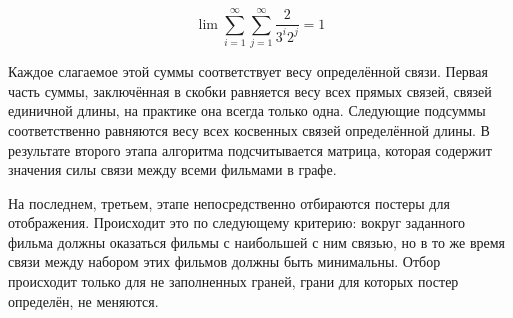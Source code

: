 \documentclass[oneside,final,12pt]{extreport}
\begin{document}
\[
\lim \sum_{i=1}^{\infty} \sum_{j=1}^{\infty} \frac{2}{ 3^{i} 2^{j} } = 1
\]

Каждое слагаемое этой суммы соответствует весу определённой связи. Первая часть суммы, заключённая в скобки равняется весу всех прямых связей, связей единичной длины, на практике она всегда только одна. Следующие подсуммы соответственно равняются весу всех косвенных связей определённой длины. В результате второго этапа алгоритма подсчитывается матрица, которая содержит значения силы связи между всеми фильмами в графе.

На последнем, третьем, этапе непосредственно отбираются постеры для отображения. Происходит это по следующему критерию: вокруг заданного фильма должны оказаться фильмы с наибольшей с ним связью, но в то же время связи между набором этих фильмов должны быть минимальны. Отбор происходит только для не заполненных граней, грани для которых постер определён, не меняются.
\end{document}
